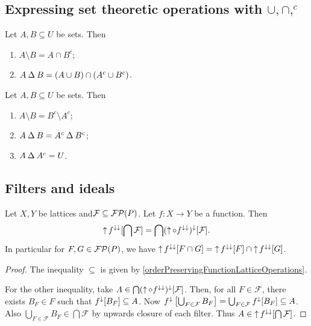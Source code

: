 \subsection{Expressing set theoretic operations with $\cup,\cap, ^c$}
\begin{proposition}
Let $A,B\subseteq U$ be sets. Then
\begin{enumerate}
\item $A\setminus B = A \cap B^c$;
\item $A\mathbin{\Delta} B = (A\cup B)\cap (A^c\cup B^c)$.
\end{enumerate}
\end{proposition}
\begin{corollary}
Let $A,B \subseteq U$ be sets. Then
\begin{enumerate}
\item $A\setminus B = B^c\setminus A^c$;
\item $A \mathbin{\Delta} B = A^c \mathbin{\Delta} B^c$;
\item $A \mathbin{\Delta} A^c = U$.
\end{enumerate}
\end{corollary}

\subsection{Filters and ideals}

\begin{lemma} \label{imageFiltersPreservesIntersection}
Let $X, Y$ be lattices and$\mathcal{F}\subseteq\operatorname{\mathcal{FP}}(P)$. Let $f:X\to Y$ be a function. Then
\[ \operatorname{\uparrow} f^{\downarrow\downarrow}[\bigcap \mathcal{F}] = \bigcap (\operatorname{\uparrow}\circ f^{\downarrow\downarrow})^{\downarrow}[\mathcal{F}]. \]
In particular for $F,G\in \operatorname{\mathcal{FP}}(P)$, we have $\operatorname{\uparrow} f^{\downarrow\downarrow}[F\cap G] = \operatorname{\uparrow} f^{\downarrow\downarrow}[F] \cap \operatorname{\uparrow} f^{\downarrow\downarrow}[G]$.
\end{lemma}
\begin{proof}
The inequality $\subseteq$ is given by \ref{orderPreservingFunctionLatticeOperations}.

For the other inequality, take $A\in \bigcap (\operatorname{\uparrow}\circ f^{\downarrow\downarrow})^{\downarrow}[\mathcal{F}]$. Then, for all $F\in\mathcal{F}$, there exists $B_F\in F$ such that $f^{\downarrow}[B_F] \subseteq A$. Now $f^{\downarrow}\left[\bigcup_{F\in\mathcal{F}}B_F\right] = \bigcup_{F\in\mathcal{F}}f^{\downarrow}[B_F] \subseteq A$. Also $\bigcup_{F\in\mathcal{F}}B_F \in \bigcap \mathcal{F}$ by upwards closure of each filter. Thus $A\in \operatorname{\uparrow} f^{\downarrow\downarrow}[\bigcap \mathcal{F}]$.
\end{proof}

